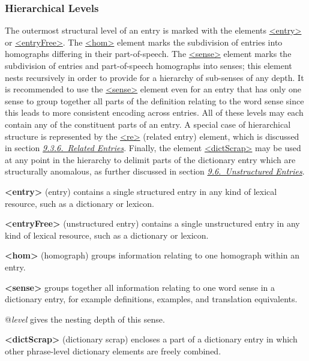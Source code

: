 \subsubsection[{Hierarchical Levels}]{Hierarchical Levels}\label{DIENHI}\par
The outermost structural level of an entry is marked with the elements \hyperref[TEI.entry]{<entry>} or \hyperref[TEI.entryFree]{<entryFree>}. The \hyperref[TEI.hom]{<hom>} element marks the subdivision of entries into homographs differing in their part-of-speech. The \hyperref[TEI.sense]{<sense>} element marks the subdivision of entries and part-of-speech homographs into senses; this element nests recursively in order to provide for a hierarchy of sub-senses of any depth. It is recommended to use the \hyperref[TEI.sense]{<sense>} element even for an entry that has only one sense to group together all parts of the definition relating to the word sense since this leads to more consistent encoding across entries. All of these levels may each contain any of the constituent parts of an entry. A special case of hierarchical structure is represented by the \hyperref[TEI.re]{<re>} (related entry) element, which is discussed in section \textit{\hyperref[DITPRE]{9.3.6.\ Related Entries}}. Finally, the element \hyperref[TEI.dictScrap]{<dictScrap>} may be used at any point in the hierarchy to delimit parts of the dictionary entry which are structurally anomalous, as further discussed in section \textit{\hyperref[DIFR]{9.6.\ Unstructured Entries}}.
\begin{sansreflist}
  
\item [\textbf{<entry>}] (entry) contains a single structured entry in any kind of lexical resource, such as a dictionary or lexicon.
\item [\textbf{<entryFree>}] (unstructured entry) contains a single unstructured entry in any kind of lexical resource, such as a dictionary or lexicon.
\item [\textbf{<hom>}] (homograph) groups information relating to one homograph within an entry.
\item [\textbf{<sense>}] groups together all information relating to one word sense in a dictionary entry, for example definitions, examples, and translation equivalents.\hfil\\[-10pt]\begin{sansreflist}
    \item[@{\itshape level}]
  gives the nesting depth of this sense.
\end{sansreflist}  
\item [\textbf{<dictScrap>}] (dictionary scrap) encloses a part of a dictionary entry in which other phrase-level dictionary elements are freely combined.
\end{sansreflist}
